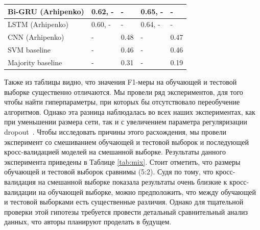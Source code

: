 \documentclass[12pt]{article}
\begin{document}
\begin{table}[]
\begin{tabular}{l|l|l|l|l|}
\multicolumn{1}{|l|}{Bi-GRU (Arhipenko)}                                                                      & 0.62, -               & -    & 0.65, -                                              & -                                   \\ \hline
\multicolumn{1}{|l|}{LSTM (Arhipenko)}                                                                        & 0.60, -               & -    & 0.64, -                                              & -                                   \\ \hline
\multicolumn{1}{|l|}{CNN (Arhipenko)}                                                                         & -                     & 0.48 & -                                                    & 0.47                                \\ \hline
\multicolumn{1}{|l|}{SVM baseline}                                                                            & -                     & 0.46 & -                                                    & 0.46                                \\ \hline
\multicolumn{1}{|l|}{Majority baseline}                                                                       & -                     & 0.31 & -                                                    & 0.19                                \\ \hline
\end{tabular}
\end{table}

Также из таблицы видно, что значения F1-меры на обучающей и тестовой выборке существенно отличаются. Мы провели ряд экспериментов, для того чтобы найти гиперпараметры, при которых бы отсутствовало переобучение алгоритмов. Однако эта разница наблюдалась во всех наших экспериментах, как при уменьшении размера сети, так и с увеличением параметра регуляризации dropout~\cite{srivastava}. Чтобы исследовать причины этого расхождения, мы провели эксперимент со смешиванием обучающей и тестовой выборок и последующей кросс-валидацией моделей на смешанной выборке. Результаты данного эксперимента приведены в Таблице \ref{tab:mix}. Стоит отметить, что размеры обучающей и тестовой выборок сравнимы (5:2). Судя по тому, что кросс-валидация на смешанной выборке показала результаты очень близкие к кросс-валидации на обучающей выборке, можно предположить, что между обучающей и тестовой выборками есть существенные различия. Однако для тщательной проверки этой гипотезы требуется провести детальный сравнительный анализ данных, что авторы планируют проделать в будущем.
\end{document}
